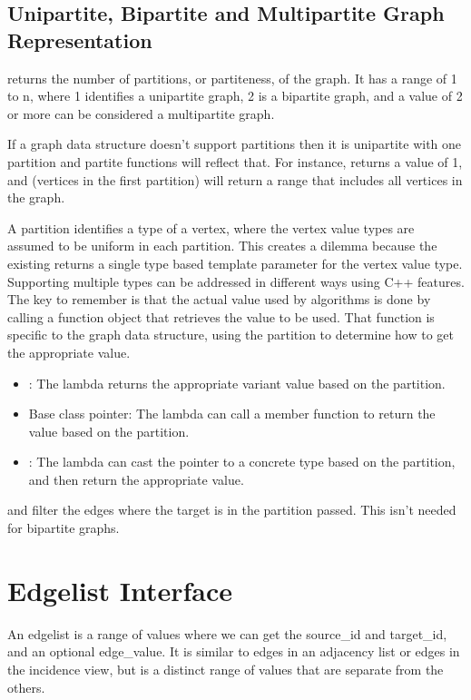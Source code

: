 \subsection{Unipartite, Bipartite and Multipartite Graph Representation}

 returns the number of partitions, or partiteness, of the graph. It has a range of 1 to n, where 1 identifies 
a unipartite graph, 2 is a bipartite graph, and a value of 2 or more can be considered a multipartite graph. 

If a graph data structure doesn't support partitions then it is unipartite with one partition and partite functions will reflect that. 
For instance,  returns a value of 1, and  (vertices in the first partition) will return a range that includes all vertices in the graph.

A partition identifies a type of a vertex, where the vertex value types are assumed to be uniform in each partition. This creates a dilemma because 
the existing  returns a single type based template parameter for the vertex value type. Supporting 
multiple types can be addressed in different ways using C++ features. The key to remember is that the actual value used by algorithms is done
by calling a function object that retrieves the value to be used. That function is specific to the graph data structure, using the partition to 
determine how to get the appropriate value.
\begin{itemize}
    \item
          : The lambda returns the appropriate variant value based on the partition.
    \item
          Base class pointer: The lambda can call a member function to return the value based on the partition.
    \item
          : The lambda can cast the pointer to a concrete type based on the partition, and
          then return the appropriate value.
\end{itemize}

 and  filter the edges where the target is in the partition  passed.
This isn't needed for bipartite graphs.

\section{Edgelist Interface}
An edgelist is a range of values where we can get the source\_id and target\_id, and an optional edge\_value. It is similar to edges in an
adjacency list or edges in the incidence view, but is a distinct range of values that are separate from the others.

